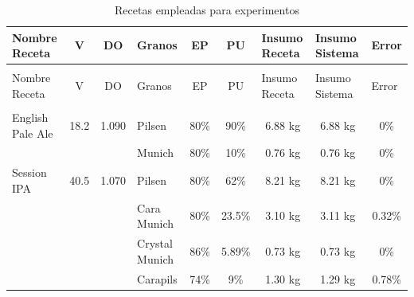 \begin{longtable}{
|p{1.8cm} %
|p{0.9cm} %
|p{0.9cm} %
|p{1.8cm} %
|p{1.0cm} %
|p{1.0cm} %
|p{1.7cm} %
|p{1.7cm} %
|p{1.0cm} %
|}
    \hline
    Nombre Receta 
    & \multicolumn{1}{c|}{V}
    & \multicolumn{1}{c|}{DO}
    & Granos
    & \multicolumn{1}{c|}{EP} 
    & \multicolumn{1}{c|}{PU} 
    & Insumo Receta
    & Insumo Sistema
    & Error \\
    \hline
    \hline
    \endfirsthead
    
    \hline
    \endfoot
    
    \hline
    \multicolumn{9}{|c|}{Continuación de la Tabla \ref{tab:TablaRecetaExperimentos}}\\
    \hline
    Nombre Receta 
    & \multicolumn{1}{c|}{V}
    & \multicolumn{1}{c|}{DO}
    & Granos 
    & \multicolumn{1}{c|}{EP} 
    & \multicolumn{1}{c|}{PU} 
    & Insumo Receta 
    & Insumo Sistema
    & Error \\
    \hline
    \hline
    \endhead
    
    \hline
    \caption{Recetas empleadas para experimentos \label{tab:TablaRecetaExperimentos}}\\
    \endlastfoot
    
    English Pale Ale
    &18.2
    &1.090
    &Pilsen 
    & \multicolumn{1}{c|}{80\%}
    &\multicolumn{1}{c|}{90\%} 
    &\multicolumn{1}{c|}{6.88 kg} 
    &\multicolumn{1}{c|}{6.88 kg} 
    & \multicolumn{1}{c|}{0\%}
    \\
    &  
    &  
    & Munich
    & \multicolumn{1}{c|}{80\%}
    & \multicolumn{1}{c|}{10\%}
    &\multicolumn{1}{c|}{0.76 kg} &\multicolumn{1}{c|}{0.76 kg} 
    & \multicolumn{1}{c|}{0\%}
    \\
    \hline

    Session IPA
    &40.5
    &1.070
    & Pilsen
    &\multicolumn{1}{c|}{80\%}
    &\multicolumn{1}{c|}{62\%} 
    & \multicolumn{1}{c|}{8.21 kg} 
    & \multicolumn{1}{c|}{8.21 kg} 
    & \multicolumn{1}{c|}{0\%}
    \\
    & 
    &  
    & Cara Munich 
    &\multicolumn{1}{c|}{80\%}
    &\multicolumn{1}{c|}{23.5\%}
    &\multicolumn{1}{c|}{3.10 kg} 
    &\multicolumn{1}{c|}{3.11 kg} 
    & \multicolumn{1}{c|}{0.32\%}
    \\
    &  
    &  
    & Crystal Munich
    &\multicolumn{1}{c|}{86\%}
    &\multicolumn{1}{c|}{5.89\%}
    &\multicolumn{1}{c|}{0.73 kg} 
    &\multicolumn{1}{c|}{0.73 kg} 
    & \multicolumn{1}{c|}{0\%}
    \\
    & 
    &  
    & Carapils 
    &\multicolumn{1}{c|}{74\%}
    & \multicolumn{1}{c|}{9\%}
    &\multicolumn{1}{c|}{1.30 kg} 
    &\multicolumn{1}{c|}{1.29 kg} 
    & \multicolumn{1}{c|}{0.78\%}
    \\
    \hline
    

\end{longtable}
